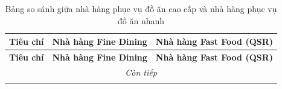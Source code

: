 \begin{longtable}{| m{3.5cm} | >{\RaggedRight}m{6.5cm} | >{\RaggedRight}m{6.5cm} |}
	\caption{Bảng so sánh giữa nhà hàng phục vụ đồ ăn cao cấp và nhà hàng phục vụ đồ ăn nhanh} \label{tab:comparison_detail}                                                                                                                                                                                                                                                                                                                                                                                                                                                                                         \\
	\hline
	\textbf{Tiêu chí}                    & \textbf{Nhà hàng Fine Dining}                                                                                                                                                                                                                                                           & \textbf{Nhà hàng Fast Food (QSR)}                                                                                                                                                                                                                                               \\
	\hline
	\endfirsthead

	\hline
	\textbf{Tiêu chí}                    & \textbf{Nhà hàng Fine Dining}                                                                                                                                                                                                                                                           & \textbf{Nhà hàng Fast Food (QSR)}                                                                                                                                                                                                                                               \\
	\hline
	\endhead

	\hline
	\multicolumn{3}{|c|}{\textit{Còn tiếp}}                                                                                                                                                                                                                                                                                                                                                                                                                                                                                                                                                                          \\
	\hline
	\endfoot


\end{longtable}
